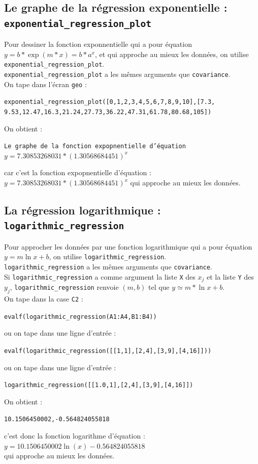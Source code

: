 \documentclass[a4paper,11pt]{book}
\begin{document}
\subsection{Le graphe de la r\'egression exponentielle : {\tt exponential\_regression\_plot}}
Pour dessiner la fonction exponnentielle qui a pour
\'equation $y=b*\exp(m*x)=b*a^x$, et qui approche au mieux les donn\'ees, on 
utilise  {\tt exponential\_regression\_plot}.\\
 {\tt exponential\_regression\_plot} a  les m\^emes arguments que 
{\tt covariance}.\\
On tape dans l'\'ecran {\tt geo} :
\begin{center}{\tt exponential\_regression\_plot([0,1,2,3,4,5,6,7,8,9,10],[7.3, 9.53,12.47,16.3,21.24,27.73,36.22,47.31,61.78,80.68,105])}\end{center}
On obtient :
\begin{center}{\tt Le graphe de la fonction expopnentielle d'\'equation 
$y=7.30853268031*(1.30568684451)^x$}\end{center}
car c'est la fonction expopnentielle d'\'equation :\\
$y=7.30853268031*(1.30568684451)^x$ qui approche au mieux les donn\'ees.
\subsection{La r\'egression logarithmique : {\tt logarithmic\_regression}}
Pour approcher les donn\'ees par une fonction logarithmique qui a pour 
\'equation $y=m \ln x+b$, on utilise  {\tt logarithmic\_regression}.\\
{\tt logarithmic\_regression} a les m\^emes arguments que {\tt covariance}.\\
Si {\tt logarithmic\_regression} a comme argument la liste {\tt X} des $x_j$ et
la liste {\tt Y} des $y_j$, {\tt logarithmic\_regression} renvoie $(m, b)$ tel 
que $y \simeq m *\ln x+b$.\\
On tape dans la case {\tt C2} :
\begin{center}{\tt evalf(logarithmic\_regression(A1:A4,B1:B4))}\end{center}
ou on tape dans une ligne d'entr\'ee :
\begin{center}{\tt evalf(logarithmic\_regression([[1,1],[2,4],[3,9],[4,16]]))}\end{center}
ou on tape dans une ligne d'entr\'ee :
\begin{center}{\tt logarithmic\_regression([[1.0,1],[2,4],[3,9],[4,16]])}\end{center}
On obtient :
\begin{center}{\tt  10.1506450002,-0.564824055818}\end{center}
c'est donc la fonction logarithme d'\'equation :\\
$y=10.1506450002\ln(x)-0.564824055818$ \\
qui approche au mieux les donn\'ees.
\end{document}
